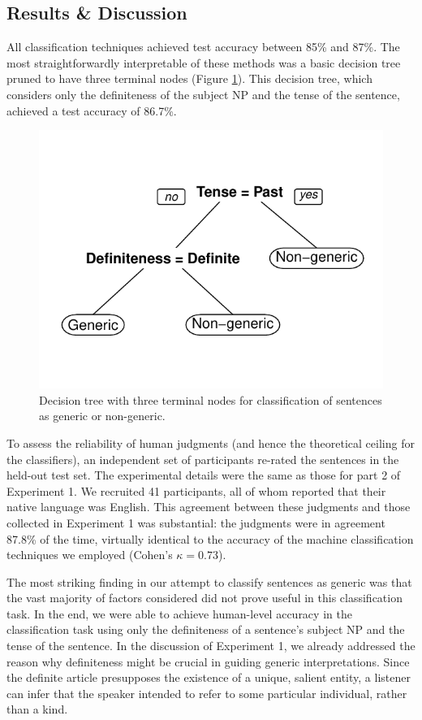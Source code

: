 \documentclass[10pt,letterpaper]{article}
\begin{document}
\subsection{Results \& Discussion}

All classification techniques achieved test accuracy between 85\% and 87\%. The most straightforwardly interpretable of these methods was a basic decision tree pruned to have three terminal nodes (Figure \ref{fig:tree}). This decision tree, which considers only the definiteness of the subject NP and the tense of the sentence, achieved a test accuracy of 86.7\%.

\begin{figure}[t]
\centering
\includegraphics[width=.8\linewidth]{figures/tree.pdf}
\caption{\label{fig:tree} Decision tree with three terminal nodes for classification of sentences as generic or non-generic.}
\end{figure}

To assess the reliability of human judgments (and hence the theoretical ceiling for the classifiers), an independent set of participants re-rated the sentences in the held-out test set. The experimental details were the same as those for part 2 of Experiment 1. We recruited 41 participants, all of whom reported that their native language was English. This agreement between these judgments and those collected in Experiment 1 was substantial: the judgments were in agreement 87.8\% of the time, virtually identical to the accuracy of the machine classification techniques we employed (Cohen's \(\kappa = 0.73\)).

The most striking finding in our attempt to classify sentences as generic was that the vast majority of factors considered did not prove useful in this classification task. In the end, we were able to achieve human-level accuracy in the classification task using only the definiteness of a sentence's subject NP and the tense of the sentence. In the discussion of Experiment 1, we already addressed the reason why definiteness might be crucial in guiding generic interpretations. Since the definite article presupposes the existence of a unique, salient entity, a listener can infer that the speaker intended to refer to some particular individual, rather than a kind.
\end{document}
